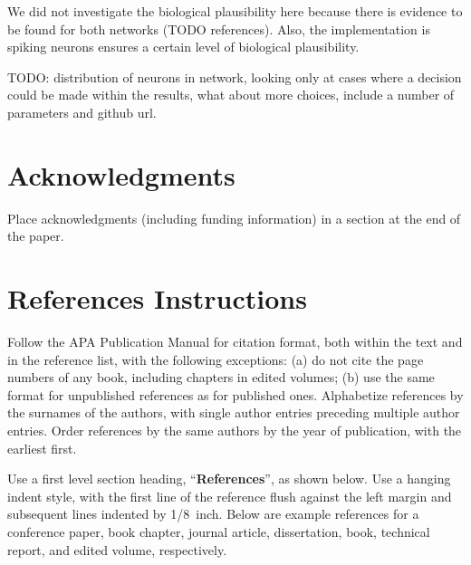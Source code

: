 \documentclass[10pt,letterpaper]{article}
\begin{document}
We did not investigate the biological plausibility here because there is 
evidence to be found for both networks (TODO references). Also, the 
implementation is spiking neurons ensures a certain level of biological 
plausibility.

TODO\@: distribution of neurons in network, looking only at cases where 
a decision could be made within the results, what about more choices, include 
a number of parameters and github url.

\section{Acknowledgments}

Place acknowledgments (including funding information) in a section at
the end of the paper.


\section{References Instructions}

Follow the APA Publication Manual for citation format, both within the
text and in the reference list, with the following exceptions: (a) do
not cite the page numbers of any book, including chapters in edited
volumes; (b) use the same format for unpublished references as for
published ones. Alphabetize references by the surnames of the authors,
with single author entries preceding multiple author entries. Order
references by the same authors by the year of publication, with the
earliest first.

Use a first level section heading, ``{\bf References}'', as shown
below. Use a hanging indent style, with the first line of the
reference flush against the left margin and subsequent lines indented
by 1/8~inch. Below are example references for a conference paper, book
chapter, journal article, dissertation, book, technical report, and
edited volume, respectively.

\nocite{ChalnickBillman1988a}
\nocite{Feigenbaum1963a}
\nocite{Hill1983a}
\nocite{OhlssonLangley1985a}
\nocite{Matlock2001}
\nocite{NewellSimon1972a}
\nocite{ShragerLangley1990a}




\setlength{\bibleftmargin}{.125in}
\setlength{\bibindent}{-\bibleftmargin}


\end{document}
